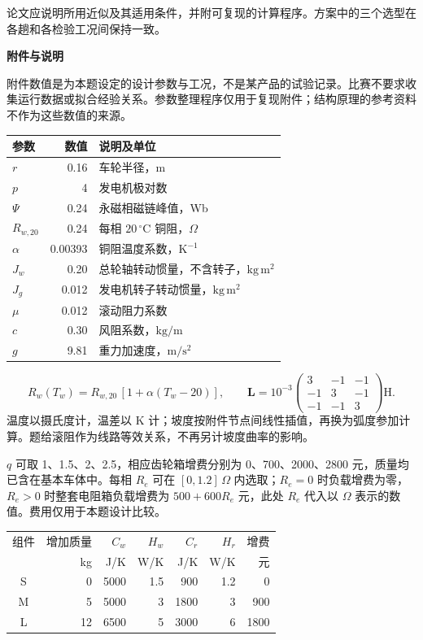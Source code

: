 \documentclass[11pt,a4paper]{article}
\begin{document}
论文应说明所用近似及其适用条件，并附可复现的计算程序。方案中的三个选型在各趟和各检验工况间保持一致。

\newpage
\begin{center}{\large\bfseries 附件与说明}\end{center}

附件数值是为本题设定的设计参数与工况，不是某产品的试验记录。比赛不要求收集运行数据或拟合经验关系。参数整理程序仅用于复现附件；结构原理的参考资料不作为这些数值的来源。

\begin{center}
\begin{tabular}{lrl}
\toprule
参数 & 数值 & 说明及单位\\\midrule
$r$ & 0.16 & 车轮半径，m\\
$p$ & 4 & 发电机极对数\\
$\Psi$ & 0.24 & 永磁相磁链峰值，Wb\\
$R_{w,20}$ & 0.24 & 每相 $20\,{}^\circ\mathrm C$ 铜阻，$\Omega$\\
$\alpha$ & 0.00393 & 铜阻温度系数，$\mathrm K^{-1}$\\
$J_w$ & 0.20 & 总轮轴转动惯量，不含转子，$\mathrm{kg\,m^2}$\\
$J_g$ & 0.012 & 发电机转子转动惯量，$\mathrm{kg\,m^2}$\\
$\mu$ & 0.012 & 滚动阻力系数\\
$c$ & 0.30 & 风阻系数，$\mathrm{kg/m}$\\
$g$ & 9.81 & 重力加速度，$\mathrm{m/s^2}$\\\bottomrule
\end{tabular}
\end{center}
\[
R_w(T_w)=R_{w,20}\,[1+\alpha(T_w-20)],\qquad
\boldsymbol L=10^{-3}
\begin{pmatrix}3&-1&-1\\-1&3&-1\\-1&-1&3\end{pmatrix}\mathrm H.
\]
温度以摄氏度计，温差以 K 计；坡度按附件节点间线性插值，再换为弧度参加计算。题给滚阻作为线路等效关系，不再另计坡度曲率的影响。

$q$ 可取 1、1.5、2、2.5，相应齿轮箱增费分别为 0、700、2000、2800 元，质量均已含在基本车体中。每相 $R_e$ 可在 $[0,1.2]\,\Omega$ 内选取；$R_e=0$ 时负载增费为零，$R_e>0$ 时整套电阻箱负载增费为 $500+600R_e$ 元，此处 $R_e$ 代入以 $\Omega$ 表示的数值。费用仅用于本题设计比较。

\begin{center}
\begin{tabular}{crrrrrr}
\toprule
组件 & 增加质量 & $C_w$ & $H_w$ & $C_r$ & $H_r$ & 增费\\
 & kg & J/K & W/K & J/K & W/K & 元\\\midrule
S & 0 & 5000 & 1.5 & 900 & 1.2 & 0\\
M & 5 & 5000 & 3 & 1800 & 3 & 900\\
L & 12 & 6500 & 5 & 3000 & 6 & 1800\\\bottomrule
\end{tabular}
\end{center}
\end{document}
